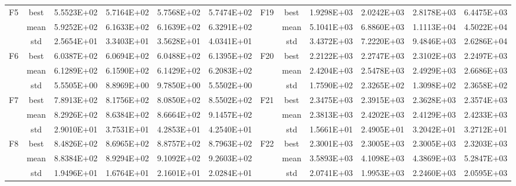 \documentclass{wzuthesis}
\begin{document}
\begin{table}[htbp]
\begin{tabular}{rrrrrrccrrrr}
    \multicolumn{1}{c}{\multirow{3}[0]{*}{F5}} & \multicolumn{1}{c}{best} & 5.5523E+02 & 5.7164E+02 & 5.7568E+02 & 5.7474E+02 & \multirow{3}[0]{*}{F19} & best  & 1.9298E+03 & 2.0242E+03 & 2.8178E+03 & 6.4475E+03 \\
          & \multicolumn{1}{c}{mean} & 5.9252E+02 & 6.1633E+02 & 6.1639E+02 & 6.3291E+02 &       & mean  & 5.1041E+03 & 6.8860E+03 & 1.1113E+04 & 4.5022E+04 \\
          & \multicolumn{1}{c}{std} & 2.5654E+01 & 3.3403E+01 & 3.5628E+01 & 4.0341E+01 &       & std   & 3.4372E+03 & 7.2220E+03 & 9.4846E+03 & 2.6286E+04 \\
    \multicolumn{1}{c}{\multirow{3}[0]{*}{F6}} & \multicolumn{1}{c}{best} & 6.0387E+02 & 6.0694E+02 & 6.0488E+02 & 6.1395E+02 & \multirow{3}[0]{*}{F20} & best  & 2.2122E+03 & 2.2747E+03 & 2.3102E+03 & 2.2497E+03 \\
          & \multicolumn{1}{c}{mean} & 6.1289E+02 & 6.1590E+02 & 6.1429E+02 & 6.2083E+02 &       & mean  & 2.4204E+03 & 2.5478E+03 & 2.4929E+03 & 2.6686E+03 \\
          & \multicolumn{1}{c}{std} & 5.5505E+00 & 8.8969E+00 & 9.7850E+00 & 5.5502E+00 &       & std   & 1.7590E+02 & 2.3265E+02 & 1.3098E+02 & 2.3658E+02 \\
    \multicolumn{1}{c}{\multirow{3}[0]{*}{F7}} & \multicolumn{1}{c}{best} & 7.8913E+02 & 8.1756E+02 & 8.0850E+02 & 8.5502E+02 & \multirow{3}[0]{*}{F21} & best  & 2.3475E+03 & 2.3915E+03 & 2.3628E+03 & 2.3574E+03 \\
          & \multicolumn{1}{c}{mean} & 8.2926E+02 & 8.6384E+02 & 8.6664E+02 & 9.1457E+02 &       & mean  & 2.3813E+03 & 2.4202E+03 & 2.4129E+03 & 2.4233E+03 \\
          & \multicolumn{1}{c}{std} & 2.9010E+01 & 3.7531E+01 & 4.2853E+01 & 4.2540E+01 &       & std   & 1.5661E+01 & 2.4905E+01 & 3.2042E+01 & 3.2712E+01 \\
    \multicolumn{1}{c}{\multirow{3}[0]{*}{F8}} & \multicolumn{1}{c}{best} & 8.4826E+02 & 8.6965E+02 & 8.8757E+02 & 8.7963E+02 & \multirow{3}[0]{*}{F22} & best  & 2.3001E+03 & 2.3005E+03 & 2.3005E+03 & 2.3203E+03 \\
          & \multicolumn{1}{c}{mean} & 8.8384E+02 & 8.9294E+02 & 9.1092E+02 & 9.2603E+02 &       & mean  & 3.5893E+03 & 4.1098E+03 & 4.3869E+03 & 5.2847E+03 \\
          & \multicolumn{1}{c}{std} & 1.9496E+01 & 1.6764E+01 & 2.1601E+01 & 2.0284E+01 &       & std   & 2.0741E+03 & 1.9953E+03 & 2.2460E+03 & 2.0595E+03 \\

\end{tabular}
\end{table}
\end{document}
